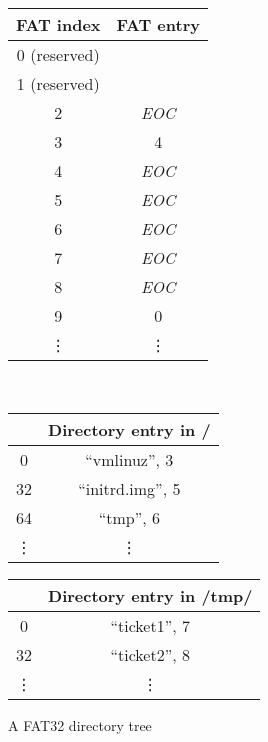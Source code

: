\documentclass[submission,copyright,creativecommons]{eptcs}
\begin{document}
\begin{figure}
  \centering
  \caption{A FAT32 directory tree}
  \label{fat32-example}

  \bigskip

  \begin{tabular}{|c|c|}
    \hline
    FAT index & FAT entry \\ \hline
    0 (reserved) &  \\ \hline
    1 (reserved) &  \\ \hline
    2 & \textit{EOC} \\ \hline
    3 & 4 \\ \hline
    4 & \textit{EOC} \\ \hline
    5 & \textit{EOC} \\ \hline
    6 & \textit{EOC} \\ \hline
    7 & \textit{EOC} \\ \hline
    8 & \textit{EOC} \\ \hline
    9 & 0 \\ \hline
    \vdots & \vdots
  \end{tabular}\\

  \bigskip

  \begin{tabular}{|c|c|}
    \hline
       & Directory entry in / \\ \hline
    0  & ``vmlinuz'', 3 \\ \hline
    32 & ``initrd.img'', 5 \\ \hline
    64 & ``tmp'', 6 \\ \hline
    \vdots & \vdots
  \end{tabular}

  \bigskip

  \begin{tabular}{|c|c|}
    \hline
       & Directory entry in /tmp/ \\ \hline
    0  & ``ticket1'', 7 \\ \hline
    32 & ``ticket2'', 8 \\ \hline
    \vdots & \vdots
  \end{tabular}
\end{figure}
\end{document}
